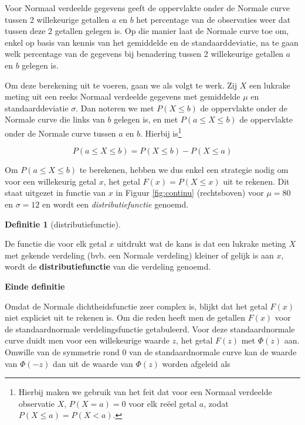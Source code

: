 \documentclass[
  12pt,dutch,coursenotes]{book}
\theoremstyle{definition}
\newtheorem{definition}{Definitie}[chapter]
\theoremstyle{definition}
\theoremstyle{definition}
\theoremstyle{definition}
\theoremstyle{remark}
\begin{document}
Voor Normaal verdeelde gegevens geeft de oppervlakte onder de Normale curve
tussen 2 willekeurige getallen \(a\) en \(b\) het percentage van de
observaties weer dat tussen deze 2 getallen gelegen is. Op die manier laat de
Normale curve toe om, enkel op basis van kennis van het gemiddelde en de
standaarddeviatie, na te gaan welk percentage van de gegevens bij benadering
tussen 2 willekeurige getallen \(a\) en \(b\) gelegen is.

Om deze berekening uit te voeren, gaan we als volgt te werk. Zij \(X\) een
lukrake meting uit een reeks Normaal verdeelde gegevens met gemiddelde \(\mu\)
en standaarddeviatie \(\sigma\). Dan noteren we met \(P(X\leq b)\) de
oppervlakte onder de Normale curve die links van \(b\) gelegen is, en met \(P(a\leq X\leq b)\) de oppervlakte onder de Normale curve tussen \(a\) en \(b\).
Hierbij is\footnote{Hierbij maken we gebruik van het feit dat voor een Normaal verdeelde observatie \(X\), \(P(X=a)=0\) voor elk reëel getal \(a\), zodat \(P(X\leq a)=P(X<a)\).}

\begin{equation*}
P(a\leq X\leq b)=P(X\leq b)-P(X\leq a)
\end{equation*}

Om \(P(a\leq X\leq b)\) te berekenen, hebben we dus enkel een strategie nodig
om voor een willekeurig getal \(x\), het getal \(F(x) = P(X \leq x)\) uit te
rekenen. Dit staat uitgezet in functie van \(x\) in Figuur \ref{fig:continu}
(rechtsboven) voor \(\mu=80\) en \(\sigma=12\) en wordt een \emph{distributiefunctie} genoemd.

\begin{definition}[distributiefunctie]
\protect\hypertarget{def:unnamed-chunk-41}{}{\label{def:unnamed-chunk-41} {} }
\end{definition}
De functie die voor elk getal \(x\) uitdrukt wat de kans is dat een lukrake
meting \(X\) met gekende verdeling (bvb. een Normale verdeling) kleiner of
gelijk is aan \(x\), wordt de \textbf{distributiefunctie} van die verdeling
genoemd.

\textbf{Einde definitie}

Omdat de Normale dichtheidsfunctie zeer complex is, blijkt dat het getal \(F(x)\) niet expliciet uit te rekenen is. Om die reden heeft men de getallen \(F(x)\)
voor de standaardnormale verdelingsfunctie getabuleerd. Voor
deze standaardnormale curve duidt men voor een willekeurige waarde \(z\), het
getal \(F(z)\) met \(\Phi(z)\) aan. Omwille van de symmetrie rond 0 van de
standaardnormale curve kan de waarde van \(\Phi(-z)\) dan uit de waarde van \(\Phi(z)\) worden afgeleid als
\end{document}
